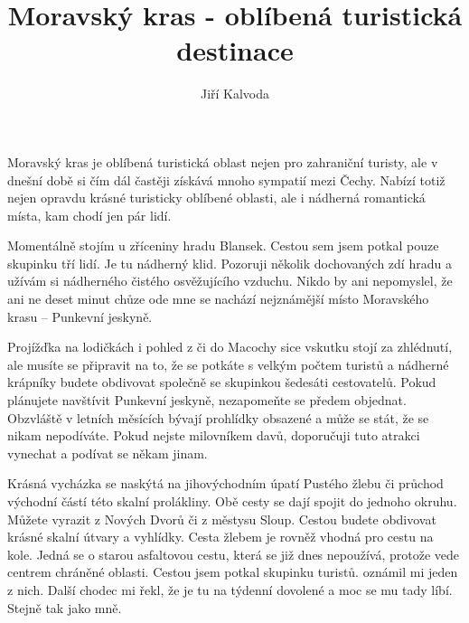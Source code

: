 \documentclass{article}
\author{Jiří Kalvoda}
\date{}
\title{Moravský kras - oblíbená turistická destinace}
\begin{document}
\maketitle
Moravský kras je oblíbená turistická oblast nejen pro zahraniční turisty, ale v dnešní době si čím dál častěji získává mnoho sympatií mezi Čechy. Nabízí totiž nejen opravdu krásné turisticky oblíbené oblasti, ale i nádherná romantická místa, kam chodí jen pár lidí.

Momentálně stojím u zříceniny hradu Blansek. Cestou sem jsem potkal pouze skupinku tří lidí. Je tu nádherný klid. Pozoruji několik dochovaných zdí hradu a užívám si nádherného čistého osvěžujícího vzduchu. Nikdo by ani nepomyslel, že ani ne deset minut chůze ode mne se nachází nejznámější místo Moravského krasu -- Punkevní jeskyně.

Projížďka na lodičkách i pohled z či do Macochy sice vskutku stojí za zhlédnutí, ale musíte se připravit na to, že se potkáte s velkým počtem turistů a nádherné krápníky budete obdivovat společně se skupinkou šedesáti cestovatelů. Pokud plánujete navštívit Punkevní jeskyně, nezapomeňte se předem objednat. Obzvláště v letních měsících bývají prohlídky obsazené a může se stát, že se nikam nepodíváte. Pokud nejste milovníkem davů, doporučuji tuto atrakci vynechat a podívat se někam jinam.

Krásná vycházka se naskýtá na jihovýchodním úpatí Pustého žlebu či průchod východní částí této skalní prolákliny. Obě cesty se dají spojit do jednoho okruhu. Můžete vyrazit z Nových Dvorů či z městysu Sloup. Cestou budete obdivovat krásné skalní útvary a vyhlídky.
Cesta žlebem je rovněž vhodná pro cestu na kole. Jedná se o starou asfaltovou cestu, která se již dnes nepoužívá, protože vede centrem chráněné oblasti. Cestou jsem potkal skupinku turistů.  oznámil mi jeden z nich. Další chodec mi řekl, že je tu na týdenní dovolené a moc se mu tady líbí. Stejně tak jako mně.
\end{document}
